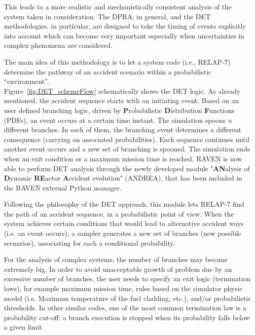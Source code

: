 \documentclass{mc2013}
\begin{document}
This leads to a more realistic and mechanistically consistent analysis of the system taken in consideration. The DPRA, in general, and the DET methodologies, in particular, are designed to take the timing of events explicitly into account which can become very important especially when uncertainties in complex phenomena are considered. 

The main idea of this methodology is to let a system code (i.e., RELAP-7) determine the pathway of an accident scenario within a probabilistic ``environment''. \\ Figure~\ref{fig:DET_schemeFlow} schematically shows the DET logic. As already mentioned, the accident sequence starts with an initiating event. Based on an user defined branching logic, driven by \textbf{P}robabilistic \textbf{D}istribution \textbf{F}unctions (PDFs), an event occurs at a certain time instant. The simulation spoons $n$ different branches. In each of them, the branching event determines a different consequence (carrying on associated probabilities). Each sequence continues until another event occurs and a new set of branching is spooned. The simulation ends when an exit condition or a maximum mission time is reached.    
\label{sec:DETRavenApproach}
RAVEN is now able to perform DET analysis through the newly developed module "\textbf{AN}alysis of \textbf{D}ynamic \textbf{RE}actor \textbf{A}ccident evolution" (ANDREA), that has been included in the RAVEN external Python manager. 

Following the philosophy of the DET approach, this module lets RELAP-7 find the path of an accident sequence, in a probabilistic point of view. When the system achieves certain conditions that would lead to alternative accident ways (i.e. an event occurs), a sampler generates a new set of branches (new possible scenarios), associating for each a conditional probability.  

For the analysis of complex systems, the number of branches may become extremely big. In order to avoid unacceptable growth of problem due by an excessive number of branches, the user needs to specify an exit logic (termination laws), for example maximum mission time, rules based on the simulator physic model (i.e. Maximum temperature of the fuel cladding, etc.), and/or probabilistic thresholds. In other similar codes, one of the most common termination law is a probability cut-off: a branch execution is stopped when its probability falls below a given limit. 
 
\end{document}
